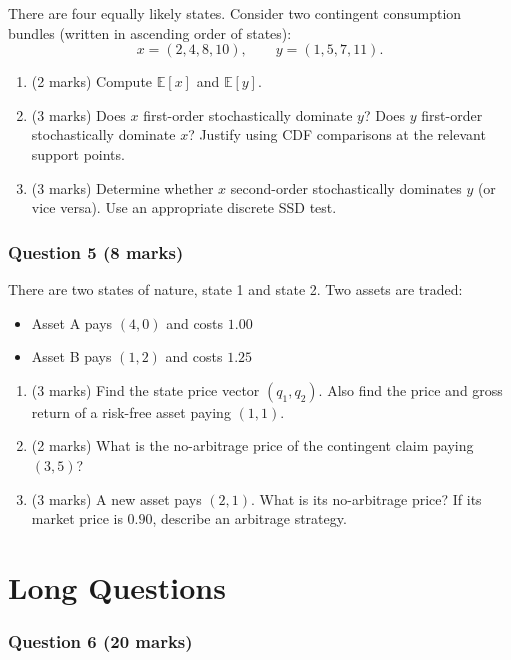 \documentclass[12pt]{article}
\begin{document}
There are four equally likely states. Consider two contingent consumption bundles (written in ascending order of states):
\[
x=(2,4,8,10),\qquad y=(1,5,7,11).
\]

\begin{enumerate}[label=(\alph*)]
\item (2 marks) Compute $\mathbb E[x]$ and $\mathbb E[y]$.
\item (3 marks) Does $x$ first-order stochastically dominate $y$? Does $y$ first-order stochastically dominate $x$? Justify using CDF comparisons at the relevant support points.
\item (3 marks) Determine whether $x$ second-order stochastically dominates $y$ (or vice versa). Use an appropriate discrete SSD test.
\end{enumerate}

\bigskip

\section*{Question 5 (8 marks)}

There are two states of nature, state 1 and state 2. Two assets are traded:
\begin{itemize}
\item Asset A pays $(4,0)$ and costs $1.00$
\item Asset B pays $(1,2)$ and costs $1.25$
\end{itemize}

\begin{enumerate}[label=(\alph*)]
\item (3 marks) Find the state price vector $(q_1,q_2)$. Also find the price and gross return of a risk-free asset paying $(1,1)$.
\item (2 marks) What is the no-arbitrage price of the contingent claim paying $(3,5)$?
\item (3 marks) A new asset pays $(2,1)$. What is its no-arbitrage price? If its market price is $0.90$, describe an arbitrage strategy.
\end{enumerate}

\newpage
\part{Long Questions}

\section*{Question 6 (20 marks)}
\end{document}
